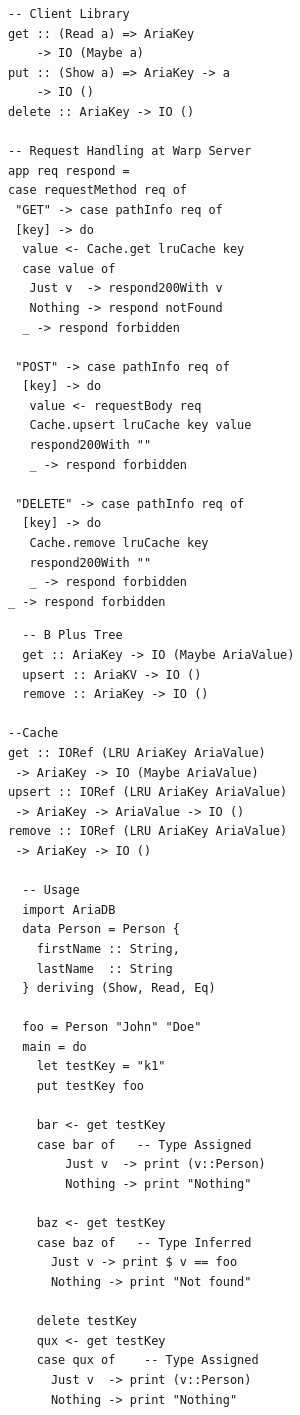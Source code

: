\documentclass[a0,portrait]{a0poster}
\begin{document}
\begin{multicols}{2}
\begin{minipage}[b]{0.5\linewidth}
\begin{verbatim}
-- Client Library
get :: (Read a) => AriaKey 
	-> IO (Maybe a)
put :: (Show a) => AriaKey -> a
	-> IO ()
delete :: AriaKey -> IO ()

-- Request Handling at Warp Server
app req respond =
case requestMethod req of
 "GET" -> case pathInfo req of
 [key] -> do
  value <- Cache.get lruCache key
  case value of
   Just v  -> respond200With v
   Nothing -> respond notFound
  _ -> respond forbidden

 "POST" -> case pathInfo req of
  [key] -> do
   value <- requestBody req
   Cache.upsert lruCache key value
   respond200With ""
   _ -> respond forbidden

 "DELETE" -> case pathInfo req of
  [key] -> do
   Cache.remove lruCache key
   respond200With ""
   _ -> respond forbidden
_ -> respond forbidden

\end{verbatim}
\end{minipage}
\begin{minipage}[b]{0.5\linewidth}
\begin{verbatim}
  -- B Plus Tree
  get :: AriaKey -> IO (Maybe AriaValue)
  upsert :: AriaKV -> IO ()
  remove :: AriaKey -> IO ()

--Cache
get :: IORef (LRU AriaKey AriaValue)
 -> AriaKey -> IO (Maybe AriaValue)
upsert :: IORef (LRU AriaKey AriaValue)
 -> AriaKey -> AriaValue -> IO ()
remove :: IORef (LRU AriaKey AriaValue)
 -> AriaKey -> IO ()
 
  -- Usage
  import AriaDB
  data Person = Person {
    firstName :: String,
    lastName  :: String
  } deriving (Show, Read, Eq)
  
  foo = Person "John" "Doe"
  main = do
    let testKey = "k1"
    put testKey foo
    
    bar <- get testKey
    case bar of   -- Type Assigned
        Just v  -> print (v::Person)
        Nothing -> print "Nothing"
        
    baz <- get testKey
    case baz of   -- Type Inferred
      Just v -> print $ v == foo
      Nothing -> print "Not found"
      
    delete testKey
    qux <- get testKey
    case qux of    -- Type Assigned
      Just v  -> print (v::Person)
      Nothing -> print "Nothing"
\end{verbatim}
\end{minipage}


\end{multicols}
\end{document}
